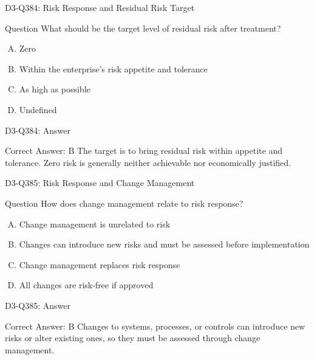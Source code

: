 \documentclass{beamer}
\begin{document}
\begin{frame}{D3-Q384: Risk Response and Residual Risk Target}
	\begin{block}{Question}
		What should be the target level of residual risk after treatment?
	\end{block}
	\begin{enumerate}[(A)]
		\item Zero
		\item Within the enterprise's risk appetite and tolerance
		\item As high as possible
		\item Undefined
	\end{enumerate}
\end{frame}
\begin{frame}{D3-Q384: Answer}
	\begin{block}{Correct Answer: B}
		The target is to bring residual risk within appetite and tolerance. Zero risk is generally neither achievable nor economically justified.
	\end{block}
\end{frame}

\begin{frame}{D3-Q385: Risk Response and Change Management}
	\begin{block}{Question}
		How does change management relate to risk response?
	\end{block}
	\begin{enumerate}[(A)]
		\item Change management is unrelated to risk
		\item Changes can introduce new risks and must be assessed before implementation
		\item Change management replaces risk response
		\item All changes are risk-free if approved
	\end{enumerate}
\end{frame}
\begin{frame}{D3-Q385: Answer}
	\begin{block}{Correct Answer: B}
		Changes to systems, processes, or controls can introduce new risks or alter existing ones, so they must be assessed through change management.
	\end{block}
\end{frame}
\end{document}
